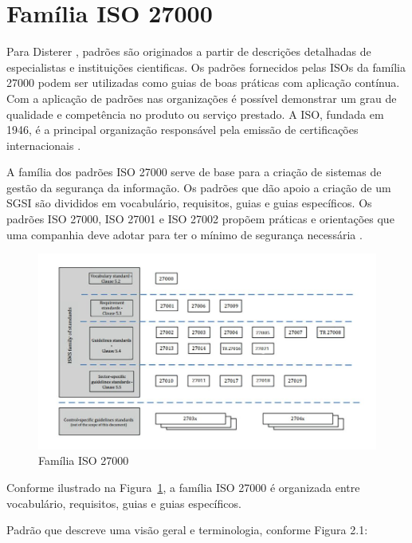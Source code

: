\section{\label{sec:secao1}Família ISO 27000}




Para Disterer \cite{disterer2013}, padrões são originados a partir de descrições detalhadas de especialistas e instituições cientificas. Os padrões fornecidos pelas ISOs da família 27000 podem ser utilizadas como guias de boas práticas com aplicação contínua. Com a aplicação de padrões nas organizações é possível demonstrar um grau de qualidade e competência no produto ou serviço prestado. A ISO, fundada em 1946, é a principal organização responsável pela emissão de certificações internacionais \cite{disterer2013}. 




A família dos padrões ISO 27000 serve de base para a criação de sistemas de gestão da segurança da informação. Os padrões que dão apoio a criação de um SGSI  são divididos em vocabulário, requisitos, guias e guias específicos. Os padrões ISO 27000, ISO 27001 e ISO 27002 propõem práticas e orientações que uma companhia deve adotar para ter o mínimo de segurança necessária \cite{disterer2013, ISOPDF}.


\begin{figure}
    \centering
    \includegraphics[scale=0.55]{fig/ISO27000.JPG}
    \caption{Família ISO 27000 \cite{ISO27000}}
    \label{fig:testeISO}
\end{figure}


Conforme ilustrado na Figura~\ref{fig:testeISO}, a família ISO 27000 é organizada entre vocabulário, requisitos, guias e guias específicos.  


\item{Padrão que descreve uma visão geral e terminologia, conforme Figura 2.1:}

